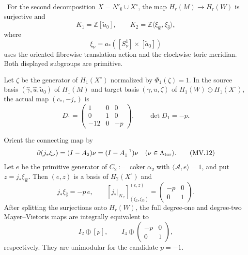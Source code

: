 \begin{proposition}
\label{prop:cusp-mv-blocks}
\Verified\ For the second decomposition $X=N'_0\cup X^\circ$, the map
$H_r(M)\to H_r(W)$ is surjective and
\[
 K_1=\mathbb Z[\widetilde a_0],
 \qquad
 K_2=\mathbb Z\langle
       \xi_{\widehat w},\xi_{\widehat\delta}\rangle,
\tag{MV.10}
\]
where
\[
 \xi_\nu=a_*([S^1_\nu]\times[\widetilde a_0])
\]
uses the oriented fibrewise translation action and the clockwise toric
meridian.  Both displayed subgroups are primitive.

Let $\zeta$ be the generator of $H_1(X^\circ)$ normalized by
$\Phi_1(\zeta)=1$.  In the source basis
$(\widehat\gamma,\widehat u,\widetilde a_0)$ of $H_1(M)$ and target basis
$(\bar\gamma,\bar u,\zeta)$ of
$H_1(W)\oplus H_1(X^\circ)$, the actual map
$(c_*,-j_*)$ is
\[
 D_1=
 \begin{pmatrix}
 1&0&0\\
 0&1&0\\
 -12&0&-p
 \end{pmatrix},
 \qquad \det D_1=-p.
\tag{MV.11}
\]

Orient the connecting map by
\[
 \partial(j_*\xi_\nu)=(I-A_2)\nu=(I-A_1^{-1})\nu
 \quad(\nu\in\Lambda_{\rm tor}).
\tag{MV.12}
\]
Let $e$ be the primitive generator of
$C_2:=\operatorname{coker}\alpha_2$ with
$\langle\mathcal A,e\rangle=1$, and put
$z=j_*\xi_{\widehat w}$.  Then $(e,z)$ is a basis of
$H_2(X^\circ)$ and
\[
 j_*\xi_{\widehat\delta}=-p\,e,
 \qquad
 [j_*|_{K_2}]_{(\xi_{\widehat\delta},\xi_{\widehat w})}^{(e,z)}
 =\begin{pmatrix}-p&0\\0&1\end{pmatrix}.
\tag{MV.13}
\]
After splitting the surjections onto $H_r(W)$, the full degree-one and
degree-two Mayer--Vietoris maps are integrally equivalent to
\[
 I_2\oplus[p],
 \qquad
 I_4\oplus
 \begin{pmatrix}-p&0\\0&1\end{pmatrix},
\tag{MV.14}
\]
respectively.  They are unimodular for the candidate $p=-1$.
\end{proposition}

